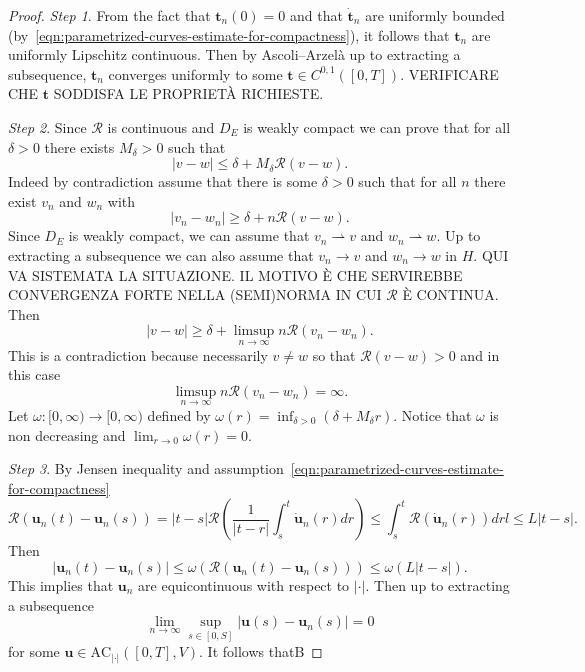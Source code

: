\documentclass[letterpaper,oneside]{amsart}
\numberwithin{equation}{section}
\theoremstyle{definition}
\begin{document}
\begin{proof}
\emph{Step 1}. From the fact that $\boldsymbol{t}_n(0)=0$ and that $\dot{\boldsymbol{t}}_n$ are uniformly bounded (by~\eqref{eqn:parametrized-curves-estimate-for-compactness}), it follows that $\boldsymbol{t}_n$ are uniformly Lipschitz continuous. Then by Ascoli--Arzelà up to extracting a subsequence, $\boldsymbol{t}_n$ converges uniformly to some $\boldsymbol{t}\in C^{0,1}([0,T])$. VERIFICARE CHE $\boldsymbol{t}$ SODDISFA LE PROPRIETÀ RICHIESTE. 

\emph{Step 2}. Since $\mathcal{R}$ is continuous and $D_E$ is weakly compact we can prove that for all $\delta>0$ there exists $M_\delta>0$ such that
\[
|v-w|\le\delta+M_\delta\mathcal{R}(v-w).
\]
Indeed by contradiction assume that there is some $\delta>0$ such that for all $n$ there exist $v_n$ and $w_n$ with
\[
|v_n-w_n|\ge\delta+n\mathcal{R}(v-w).
\]
Since $D_E$ is weakly compact, we can assume that $v_n\rightharpoonup v$ and $w_n\rightharpoonup w$. Up to extracting a subsequence we can also assume that $v_n\to v$ and $w_n\to w$ in $H$. QUI VA SISTEMATA LA SITUAZIONE. IL MOTIVO È CHE SERVIREBBE CONVERGENZA FORTE NELLA (SEMI)NORMA IN CUI $\mathcal{R}$ È CONTINUA. Then
\[
|v-w|\ge\delta+\limsup_{n\to\infty}n\mathcal{R}(v_n-w_n).
\]
This is a contradiction because necessarily $v\neq w$ so that $\mathcal{R}(v-w)>0$ and in this case
\[
\limsup_{n\to\infty}n\mathcal{R}(v_n-w_n)=\infty.
\]
Let $\omega\colon[0,\infty)\to[0,\infty)$ defined by $\omega(r)=\inf_{\delta>0}\left(\delta+M_\delta r\right)$. Notice that $\omega$ is non decreasing and  $\lim_{r\to0}\omega(r)=0$.

\emph{Step 3}. By Jensen inequality and assumption~\eqref{eqn:parametrized-curves-estimate-for-compactness}
\[
\mathcal{R}(\boldsymbol{u}_n(t)-\boldsymbol{u}_n(s))=|t-s|\mathcal{R}\left(\frac{1}{|t-r|}\int_s^t\dot{\boldsymbol{u}}_n(r)dr\right)\le\int_s^t\mathcal{R}(\dot{\boldsymbol{u}}_n(r))drl\le L|t-s|.
\]
Then
\[
|\boldsymbol{u}_n(t)-\boldsymbol{u}_n(s)|\le\omega(\mathcal{R}(\boldsymbol{u}_n(t)-\boldsymbol{u}_n(s)))\le\omega(L|t-s|).
\]
This implies that $\boldsymbol{u}_n$ are equicontinuous with respect to $|\cdot|$. Then up to extracting a subsequence
\[
\lim_{n\to\infty}\sup_{s\in[0,S]}|\boldsymbol{u}(s)-\boldsymbol{u}_n(s)|=0
\]
for some $\boldsymbol{u}\in\text{AC}_{|\cdot|}([0,T],V)$. It follows thatB
\end{proof}
\end{document}
